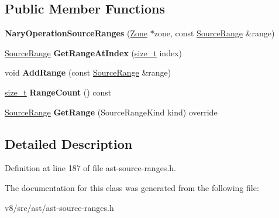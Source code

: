 \subsection*{Public Member Functions}
\begin{DoxyCompactItemize}
\item 
\mbox{\label{classv8_1_1internal_1_1NaryOperationSourceRanges_a2dcc7435ea2614728d2e78fc81a5c826}} 
{\bfseries Nary\+Operation\+Source\+Ranges} (\mbox{\hyperlink{classv8_1_1internal_1_1Zone}{Zone}} $\ast$zone, const \mbox{\hyperlink{structv8_1_1internal_1_1SourceRange}{Source\+Range}} \&range)
\item 
\mbox{\label{classv8_1_1internal_1_1NaryOperationSourceRanges_a4702c2e95bc6934b30b67d7ac53ca7af}} 
\mbox{\hyperlink{structv8_1_1internal_1_1SourceRange}{Source\+Range}} {\bfseries Get\+Range\+At\+Index} (\mbox{\hyperlink{classsize__t}{size\+\_\+t}} index)
\item 
\mbox{\label{classv8_1_1internal_1_1NaryOperationSourceRanges_aaedf19c6796207e3cd90fb775ce20900}} 
void {\bfseries Add\+Range} (const \mbox{\hyperlink{structv8_1_1internal_1_1SourceRange}{Source\+Range}} \&range)
\item 
\mbox{\label{classv8_1_1internal_1_1NaryOperationSourceRanges_af050766cd0be80dc6a3d5a25c6a6ed1c}} 
\mbox{\hyperlink{classsize__t}{size\+\_\+t}} {\bfseries Range\+Count} () const
\item 
\mbox{\label{classv8_1_1internal_1_1NaryOperationSourceRanges_a45637bbd267e4250a6bb6f75d593a718}} 
\mbox{\hyperlink{structv8_1_1internal_1_1SourceRange}{Source\+Range}} {\bfseries Get\+Range} (Source\+Range\+Kind kind) override
\end{DoxyCompactItemize}


\subsection{Detailed Description}


Definition at line 187 of file ast-\/source-\/ranges.\+h.



The documentation for this class was generated from the following file\+:\begin{DoxyCompactItemize}
\item 
v8/src/ast/ast-\/source-\/ranges.\+h\end{DoxyCompactItemize}
